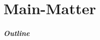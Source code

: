 \part{Main-Matter}%
\begin{frame}%
\frametitle{Outline}%
\tableofcontents%
\end{frame}%
%
%
%
\expandafter\ifstrequal\expandafter{\DenKrMicrotypeLoaded}{1}{%
\microtypesetup{activate=true}%
}{}%
